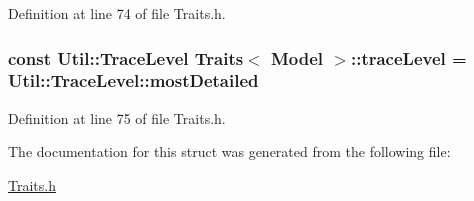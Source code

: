 Definition at line 74 of file Traits.\-h.

\hypertarget{struct_traits_3_01_model_01_4_a2514a0ce35ca8177c4605b4b2266eb05}{
\subsubsection[{trace\-Level}]{\setlength{\rightskip}{0pt plus 5cm}const {\bf Util\-::\-Trace\-Level} {\bf Traits}$<$ {\bf Model} $>$\-::trace\-Level = {\bf Util\-::\-Trace\-Level\-::most\-Detailed}\hspace{0.3cm}{\ttfamily [static]}}}\label{struct_traits_3_01_model_01_4_a2514a0ce35ca8177c4605b4b2266eb05}


Definition at line 75 of file Traits.\-h.



The documentation for this struct was generated from the following file\-:\begin{DoxyCompactItemize}
\item 
\hyperlink{_traits_8h}{Traits.\-h}\end{DoxyCompactItemize}
